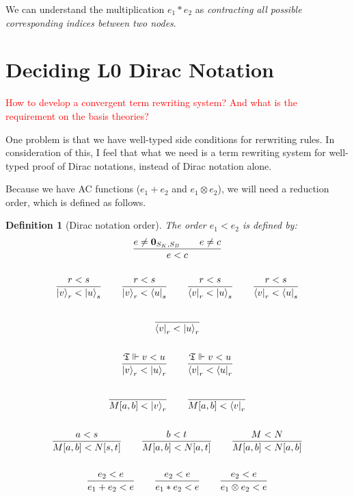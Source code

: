 \documentclass{article}
\newtheorem{dfn}{Definition}
\begin{document}
We can understand the multiplication $e_1 * e_2$ as \textit{contracting all possible corresponding indices between two nodes}.

\section{Deciding L0 Dirac Notation}

\textcolor{red}{How to develop a convergent term rewriting system? And what is the requirement on the basis theories?}

\vspace{1em}

One problem is that we have well-typed side conditions for rerwriting rules. In consideration of this, I feel that what we need is a term rewriting system for well-typed proof of Dirac notations, instead of Dirac notation alone.

\vspace{1em}
Because we have AC functions ($e_1 + e_2$ and $e_1 \otimes e_2$), we will need a reduction order, which is defined as follows.

\begin{dfn}[Dirac notation order]
  The order $e_1 < e_2$ is defined by:
  \begin{gather*}
    \frac{e \neq \textbf{0}_{S_K, S_B}\qquad e \neq c}{e < c}\\
    \ \\
    \frac{r < s}{\ket{v}_r < \ket{u}_s} \qquad \frac{r < s}{\ket{v}_r < \bra{u}_s}\qquad \frac{r < s}{\bra{v}_r < \ket{u}_s}\qquad \frac{r < s}{\bra{v}_r < \bra{u}_s}\\
    \ \\
    \frac{}{\bra{v}_r < \ket{u}_r} \\
    \ \\
    \frac{\mathfrak{T} \Vdash v < u}{\ket{v}_r < \ket{u}_r}\qquad\frac{\mathfrak{T} \Vdash v < u}{\bra{v}_r < \bra{u}_r}\\
    \ \\
    \frac{}{M[a, b] < \ket{v}_r}\qquad \frac{}{M[a, b] < \bra{v}_r}\\
    \ \\
    \frac{a < s}{M[a, b]<N[s, t]}\qquad \frac{b < t}{M[a, b]<N[a, t]}\qquad \frac{M < N}{M[a, b] < N[a, b]}\\
    \ \\
    \frac{e_2 < e}{e_1 + e_2 < e}\qquad \frac{e_2 < e}{e_1 * e_2 < e} \qquad \frac{e_2 < e}{e_1 \otimes e_2 < e}
  \end{gather*}
\end{dfn}
\end{document}
